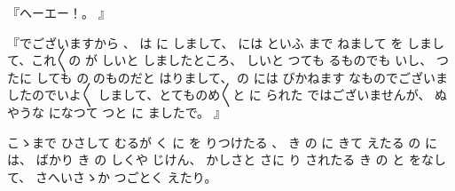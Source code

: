 『ヘーエー！。
』

『でございますから
、
は
に
しまして、
には
といふ
まで
ねまして
を
しまして、これ〳〵の
が
しいと
しましたところ、
しいと
つても
るものでも
いし、
つたに
しても
の
のものだと
はりまして、
の
には
びかねます
なものでございましたのでいよ〳〵
しまして、とてものめ〳〵と
に
られた
ではございませんが、
ぬやうな
になつて
つと
に
ましたで。
』

こゝまで
ひさして
むるが
く
に
を
りつけたる
、
き
の
に
きて
えたる
の
には、
ばかり
き
の
しくや
じけん、
かしさと
さに
り
されたる
き
の
と
をなして、
さへいさゝか
つごとく
えたり。

